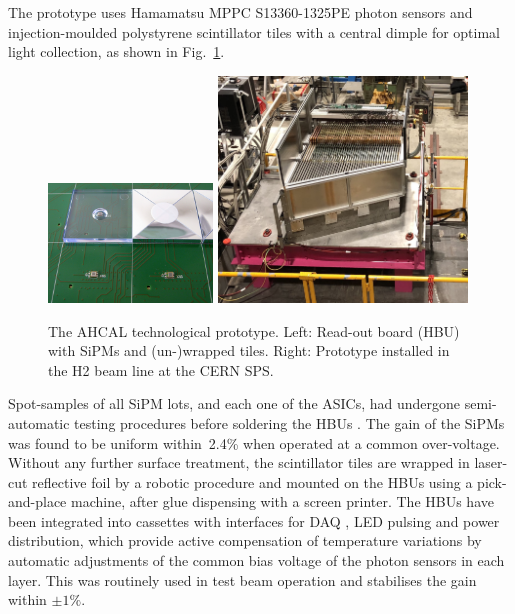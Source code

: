 The prototype uses Hamamatsu MPPC S13360-1325PE photon sensors and injection-moulded polystyrene scintillator tiles with a central dimple \cite{Liu:2015cpe} for optimal light collection, as shown in Fig.~\ref{fig:AHCAL-TileProto}. 
\begin{figure}[hbt]
\centering
\includegraphics[width=0.39\textwidth]{Detector/fig/hcal-tiles.jpeg}
\includegraphics[width=0.59\textwidth]{Detector/fig/AHCAL-prototype.jpeg}
\caption{The AHCAL technological prototype. Left: Read-out board (HBU) with SiPMs and (un-)wrapped tiles. Right: Prototype installed in the H2 beam line at the CERN SPS.} 
\label{fig:AHCAL-TileProto}
\end{figure}
%
Spot-samples of all SiPM lots, and each one of the ASICs, had undergone semi-automatic testing procedures before soldering the HBUs \cite{Munwes:2634923}. The gain of the SiPMs was found to be uniform within~2.4\% when operated at a common over-voltage.
Without any further surface treatment, the scintillator tiles are wrapped in laser-cut reflective foil by a robotic procedure and mounted on the HBUs using a pick-and-place machine, after glue dispensing with a screen printer.   
%
The HBUs have been integrated into cassettes with interfaces for DAQ \cite{Kvasnicka:2017bpx}, LED pulsing and power distribution, which provide active compensation of temperature variations by automatic adjustments of the common bias voltage of the photon sensors in each layer. This was routinely used in test beam operation and stabilises the gain within $\pm 1\%$.
